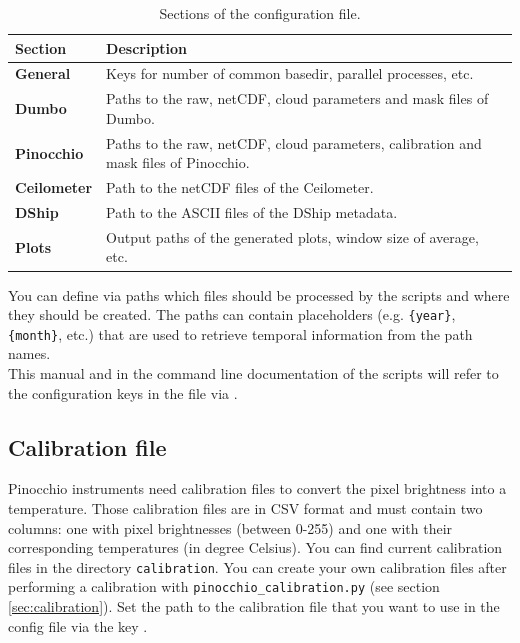\documentclass[11pt,a4paper]{article}
\begin{document}
\begin{table}[h!]
	\centering
	\caption{Sections of the configuration file.}
	\label{tab:config-file}
    \begin{tabular}{|l|l|}
    \hline 
    \textbf{Section} & \textbf{Description} \\ 
    \hline \hline 
    \textbf{General} & Keys for number of common basedir, parallel processes, etc. \\ 
    \hline 
    \textbf{Dumbo} & Paths to the raw, netCDF, cloud parameters and mask files of Dumbo. \\ 
    \hline 
    \textbf{Pinocchio} & Paths to the raw, netCDF, cloud parameters, calibration and mask files of Pinocchio. \\ 
    \hline 
    \textbf{Ceilometer} & Path to the netCDF files of the Ceilometer. \\ 
    \hline 
    \textbf{DShip} & Path to the ASCII files of the DShip metadata. \\ 
    \hline 
    \textbf{Plots} & Output paths of the generated plots, window size of average, etc. \\ 
    \hline 
    \end{tabular}
\end{table}

You can define via paths which files should be processed by the scripts and where they should be created. The paths can contain placeholders (e.g. \texttt{\{year\}}, \texttt{\{month\}}, etc.) that are used to retrieve temporal information from the path names.\\

This manual and in the command line documentation of the scripts will refer to the configuration keys in the file via .

\subsection{Calibration file}
Pinocchio instruments need calibration files to convert the pixel brightness into a temperature. Those calibration files are in CSV format and must contain two columns: one with pixel brightnesses (between 0-255) and one with their corresponding temperatures (in degree Celsius). You can find current calibration files in the directory \texttt{calibration}. You can create your own calibration files after performing a calibration with \texttt{pinocchio\_calibration.py} (see section \ref{sec:calibration}). Set the path to the calibration file that you want to use in the config file via the key .
\end{document}
